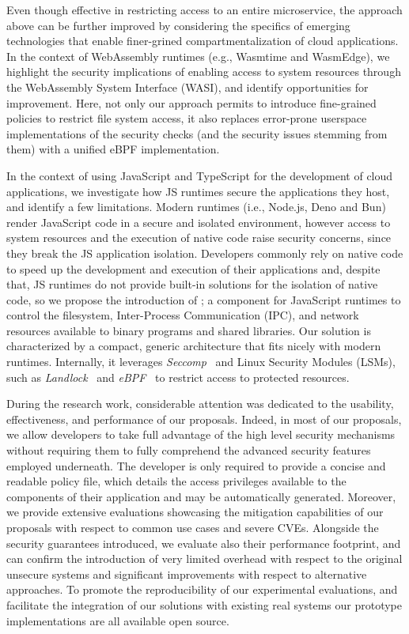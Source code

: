 Even though effective in restricting access to an entire microservice,
the approach above can be further improved by considering the
specifics of emerging technologies that enable finer-grined
compartmentalization of cloud applications. In the context of
WebAssembly runtimes (e.g., Wasmtime and WasmEdge), we highlight the
security implications of enabling access to system resources through
the WebAssembly System Interface (WASI), and identify opportunities
for improvement. Here, not only our approach permits to introduce
fine-grained policies to restrict file system access, it also replaces
error-prone userspace implementations of the security checks (and the
security issues stemming from them) with a unified eBPF
implementation.

In the context of using JavaScript and TypeScript for the development
of cloud applications, we investigate how JS runtimes secure the
applications they host, and identify a few limitations. Modern
runtimes (i.e., Node.js, Deno and Bun) render JavaScript code in a
secure and isolated environment, however access to system resources
and the execution of native code raise security concerns, since they
break the JS application isolation. Developers commonly rely on native
code to speed up the development and execution of their applications
and, despite that, JS runtimes do not provide built-in solutions for
the isolation of native code, so we propose the introduction of
\natisand; a component for JavaScript runtimes to control the
filesystem, Inter-Process Communication (IPC), and network resources
available to binary programs and shared libraries. Our solution is
characterized by a compact, generic architecture that fits nicely with
modern runtimes. Internally, it leverages {\em
  Seccomp}~\cite{seccompbpf} and Linux Security Modules (LSMs), such
as {\em Landlock}~\cite{landlock} and {\em eBPF}~\cite{corbet2014eBPF}
to restrict access to protected resources.

During the research work, considerable attention was dedicated to the
usability, effectiveness, and performance of our proposals. Indeed, in
most of our proposals, we allow developers to take full advantage of
the high level security mechanisms without requiring them to fully
comprehend the advanced security features employed underneath. The
developer is only required to provide a concise and readable policy
file, which details the access privileges available to the components
of their application and may be automatically generated. Moreover, we
provide extensive evaluations showcasing the mitigation capabilities
of our proposals with respect to common use cases and severe CVEs.
Alongside the security guarantees introduced, we evaluate also their
performance footprint, and can confirm the introduction of very
limited overhead with respect to the original unsecure systems and
significant improvements with respect to alternative approaches. To
promote the reproducibility of our experimental evaluations, and
facilitate the integration of our solutions with existing real systems
our prototype implementations are all available open source.

